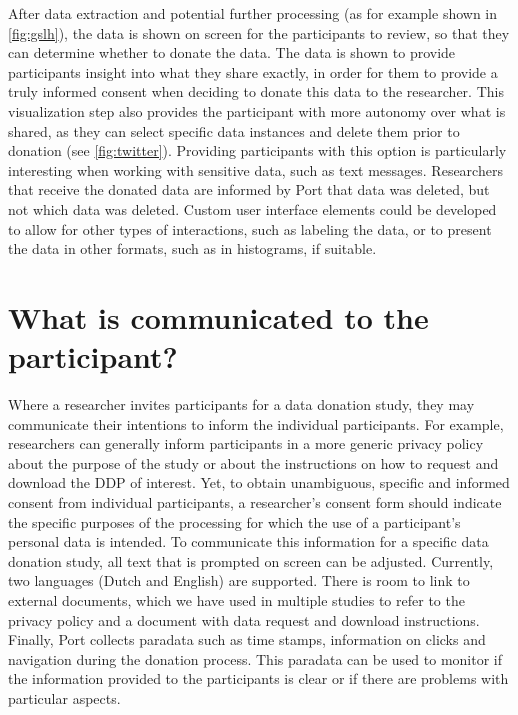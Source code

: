 \documentclass[
]{article}
\begin{document}
After data extraction and potential further processing (as for example
shown in \autoref{fig:gslh}), the data is shown on screen for the
participants to review, so that they can determine whether to donate the
data. The data is shown to provide participants insight into what they
share exactly, in order for them to provide a truly informed consent
when deciding to donate this data to the researcher. This visualization
step also provides the participant with more autonomy over what is
shared, as they can select specific data instances and delete them prior
to donation (see \autoref{fig:twitter}). Providing participants with
this option is particularly interesting when working with sensitive
data, such as text messages. Researchers that receive the donated data
are informed by Port that data was deleted, but not which data was
deleted. Custom user interface elements could be developed to allow for
other types of interactions, such as labeling the data, or to present
the data in other formats, such as in histograms, if suitable.

\hypertarget{what-is-communicated-to-the-participant}{%
\section{What is communicated to the
participant?}\label{what-is-communicated-to-the-participant}}

Where a researcher invites participants for a data donation study, they
may communicate their intentions to inform the individual participants.
For example, researchers can generally inform participants in a more
generic privacy policy about the purpose of the study or about the
instructions on how to request and download the DDP of interest. Yet, to
obtain unambiguous, specific and informed consent from individual
participants, a researcher's consent form should indicate the specific
purposes of the processing for which the use of a participant's personal
data is intended. To communicate this information for a specific data
donation study, all text that is prompted on screen can be adjusted.
Currently, two languages (Dutch and English) are supported. There is
room to link to external documents, which we have used in multiple
studies to refer to the privacy policy and a document with data request
and download instructions. Finally, Port collects paradata such as time
stamps, information on clicks and navigation during the donation
process. This paradata can be used to monitor if the information
provided to the participants is clear or if there are problems with
particular aspects.
\end{document}
